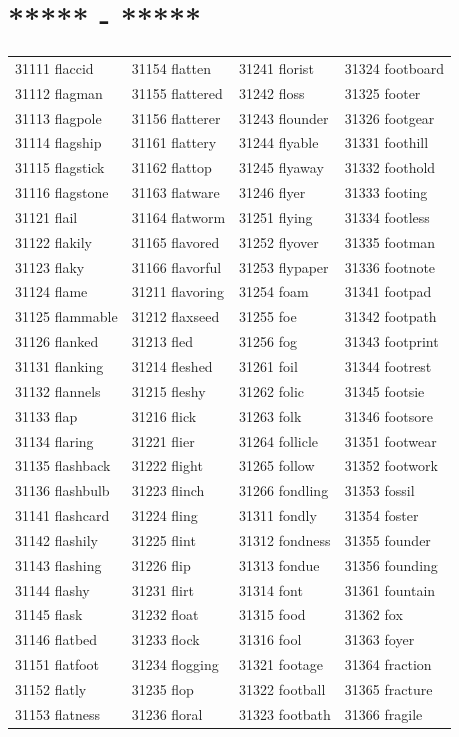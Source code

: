 \documentclass[10pt, oneside]{book}
\begin{document}
\begin{table}[h]
	\centering
	\section*{***** - *****}
	\begin{tabular}{l l l l}
31111 flaccid &31154 flatten &31241 florist &31324 footboard\\
31112 flagman &31155 flattered &31242 floss &31325 footer\\
31113 flagpole &31156 flatterer &31243 flounder &31326 footgear\\
31114 flagship &31161 flattery &31244 flyable &31331 foothill\\
31115 flagstick &31162 flattop &31245 flyaway &31332 foothold\\
31116 flagstone &31163 flatware &31246 flyer &31333 footing\\
31121 flail &31164 flatworm &31251 flying &31334 footless\\
31122 flakily &31165 flavored &31252 flyover &31335 footman\\
31123 flaky &31166 flavorful &31253 flypaper &31336 footnote\\
31124 flame &31211 flavoring &31254 foam &31341 footpad\\
31125 flammable &31212 flaxseed &31255 foe &31342 footpath\\
31126 flanked &31213 fled &31256 fog &31343 footprint\\
31131 flanking &31214 fleshed &31261 foil &31344 footrest\\
31132 flannels &31215 fleshy &31262 folic &31345 footsie\\
31133 flap &31216 flick &31263 folk &31346 footsore\\
31134 flaring &31221 flier &31264 follicle &31351 footwear\\
31135 flashback &31222 flight &31265 follow &31352 footwork\\
31136 flashbulb &31223 flinch &31266 fondling &31353 fossil\\
31141 flashcard &31224 fling &31311 fondly &31354 foster\\
31142 flashily &31225 flint &31312 fondness &31355 founder\\
31143 flashing &31226 flip &31313 fondue &31356 founding\\
31144 flashy &31231 flirt &31314 font &31361 fountain\\
31145 flask &31232 float &31315 food &31362 fox\\
31146 flatbed &31233 flock &31316 fool &31363 foyer\\
31151 flatfoot &31234 flogging &31321 footage &31364 fraction\\
31152 flatly &31235 flop &31322 football &31365 fracture\\
31153 flatness &31236 floral &31323 footbath &31366 fragile\\
	\end{tabular}
 \end{table}
\end{document}
